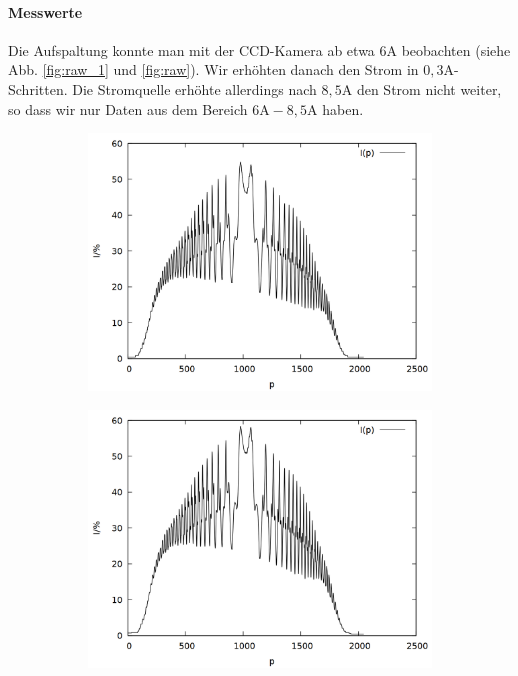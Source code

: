 \paragraph{Messwerte}
Die Aufspaltung konnte man mit der CCD-Kamera ab etwa $6\si{\ampere}$ beobachten (siehe Abb. \ref{fig:raw_1} und \ref{fig:raw}). Wir erhöhten danach den Strom in $0,3\si{\ampere}$-Schritten. Die Stromquelle erhöhte allerdings nach $8,5\si{\ampere}$ den Strom nicht weiter, so dass wir nur Daten aus dem Bereich $6\si{\ampere}-8,5\si{\ampere}$ haben.
\begin{figure}[!h]
\centering
\begin{subfigure}{0.45\textwidth}
\includegraphics[width=\textwidth]{data/zeeman/out_6_0_raw.png}
\end{subfigure}
\begin{subfigure}{0.45\textwidth}
\includegraphics[width=\textwidth]{data/zeeman/out_6_3_raw.png}

\end{subfigure}
\end{figure}
